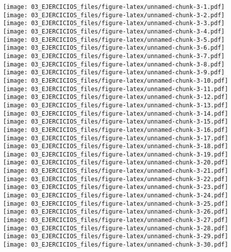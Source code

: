 \documentclass[
]{book}
\begin{document}
\texttt{[image: 03\_EJERCICIOS\_files/figure-latex/unnamed-chunk-3-1.pdf]} \texttt{[image: 03\_EJERCICIOS\_files/figure-latex/unnamed-chunk-3-2.pdf]} \texttt{[image: 03\_EJERCICIOS\_files/figure-latex/unnamed-chunk-3-3.pdf]} \texttt{[image: 03\_EJERCICIOS\_files/figure-latex/unnamed-chunk-3-4.pdf]} \texttt{[image: 03\_EJERCICIOS\_files/figure-latex/unnamed-chunk-3-5.pdf]} \texttt{[image: 03\_EJERCICIOS\_files/figure-latex/unnamed-chunk-3-6.pdf]} \texttt{[image: 03\_EJERCICIOS\_files/figure-latex/unnamed-chunk-3-7.pdf]} \texttt{[image: 03\_EJERCICIOS\_files/figure-latex/unnamed-chunk-3-8.pdf]} \texttt{[image: 03\_EJERCICIOS\_files/figure-latex/unnamed-chunk-3-9.pdf]} \texttt{[image: 03\_EJERCICIOS\_files/figure-latex/unnamed-chunk-3-10.pdf]} \texttt{[image: 03\_EJERCICIOS\_files/figure-latex/unnamed-chunk-3-11.pdf]} \texttt{[image: 03\_EJERCICIOS\_files/figure-latex/unnamed-chunk-3-12.pdf]} \texttt{[image: 03\_EJERCICIOS\_files/figure-latex/unnamed-chunk-3-13.pdf]} \texttt{[image: 03\_EJERCICIOS\_files/figure-latex/unnamed-chunk-3-14.pdf]} \texttt{[image: 03\_EJERCICIOS\_files/figure-latex/unnamed-chunk-3-15.pdf]} \texttt{[image: 03\_EJERCICIOS\_files/figure-latex/unnamed-chunk-3-16.pdf]} \texttt{[image: 03\_EJERCICIOS\_files/figure-latex/unnamed-chunk-3-17.pdf]} \texttt{[image: 03\_EJERCICIOS\_files/figure-latex/unnamed-chunk-3-18.pdf]} \texttt{[image: 03\_EJERCICIOS\_files/figure-latex/unnamed-chunk-3-19.pdf]} \texttt{[image: 03\_EJERCICIOS\_files/figure-latex/unnamed-chunk-3-20.pdf]} \texttt{[image: 03\_EJERCICIOS\_files/figure-latex/unnamed-chunk-3-21.pdf]} \texttt{[image: 03\_EJERCICIOS\_files/figure-latex/unnamed-chunk-3-22.pdf]} \texttt{[image: 03\_EJERCICIOS\_files/figure-latex/unnamed-chunk-3-23.pdf]} \texttt{[image: 03\_EJERCICIOS\_files/figure-latex/unnamed-chunk-3-24.pdf]} \texttt{[image: 03\_EJERCICIOS\_files/figure-latex/unnamed-chunk-3-25.pdf]} \texttt{[image: 03\_EJERCICIOS\_files/figure-latex/unnamed-chunk-3-26.pdf]} \texttt{[image: 03\_EJERCICIOS\_files/figure-latex/unnamed-chunk-3-27.pdf]} \texttt{[image: 03\_EJERCICIOS\_files/figure-latex/unnamed-chunk-3-28.pdf]} \texttt{[image: 03\_EJERCICIOS\_files/figure-latex/unnamed-chunk-3-29.pdf]} \texttt{[image: 03\_EJERCICIOS\_files/figure-latex/unnamed-chunk-3-30.pdf]}
\end{document}

